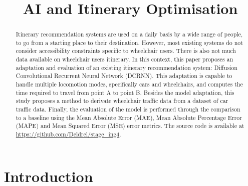 \documentclass[conference]{IEEEtran}
\begin{document}


    \title{AI and Itinerary Optimisation}
    \author{
        \and
        \and
    }

    \maketitle

    \begin{abstract}
        Itinerary recommendation systems are used on a daily basis by a wide range of people, to go from a starting place to their destination.
        However, most existing systems do not consider accessibility constraints specific to wheelchair users.
        There is also not much data available on wheelchair users itinerary.
        In this context, this paper proposes an adaptation and evaluation of an existing itinerary recommendation system: Diffusion Convolutional Recurrent Neural Network (DCRNN).
        This adaptation is capable to handle multiple locomotion modes, specifically cars and wheelchairs, and computes the time required to travel from point A to point B.
        Besides the model adaptation, this study proposes a method to derivate wheelchair traffic data from a dataset of car traffic data.
        Finally, the evaluation of the model is performed through the comparison to a baseline using the Mean Absolute Error (MAE), Mean Absolute Percentage Error (MAPE) and Mean Squared Error (MSE) error metrics.
        The source code is available at \url{https://github.com/Deldrel/stage_ing4}.
    \end{abstract}


    \section{Introduction}\label{sec:introduction}
\end{document}
